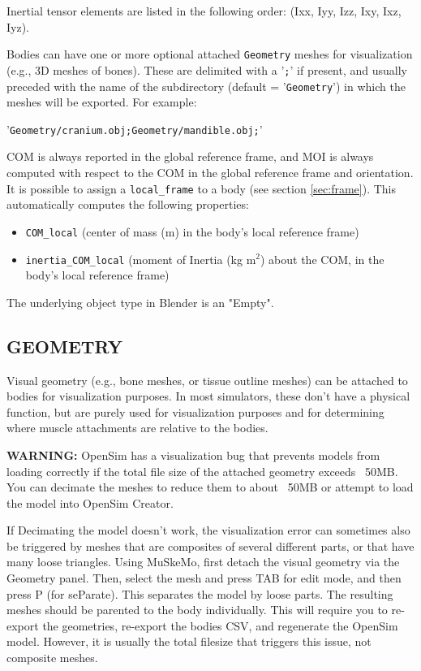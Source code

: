 \documentclass{article}
\begin{document}
Inertial tensor elements are listed in the following order: (Ixx, Iyy, Izz, Ixy, Ixz, Iyz).

Bodies can have one or more optional attached \texttt{Geometry} meshes for visualization (e.g., 3D meshes of bones). These are delimited with a '\texttt{;}' if present, and usually preceded with the name of the subdirectory (default = '\texttt{Geometry}') in which the meshes will be exported. For example: 

'\texttt{Geometry/cranium.obj;Geometry/mandible.obj;}'

COM is always reported in the global reference frame, and MOI is always computed with respect to the COM in the global reference frame and orientation. It is possible to assign a \texttt{local\_frame} to a body (see section \ref{sec:frame}). This automatically computes the following properties:


\begin{itemize}
    \item \texttt{COM\_local} (center of mass (m) in the body's local reference frame)
    \item \texttt{inertia\_COM\_local} (moment of Inertia (kg m\(^2\)) about the COM, in the body's local reference frame)
\end{itemize}

The underlying object type in Blender is an "Empty".

\subsection{GEOMETRY}

Visual geometry (e.g., bone meshes, or tissue outline meshes) can be attached to bodies for visualization purposes. In most simulators, these don’t have a physical function, but are purely used for visualization purposes and for determining where muscle attachments are relative to the bodies. 

\textbf{WARNING:} OpenSim has a visualization bug that prevents models from loading correctly if the total file size of the attached geometry exceeds ~50MB. You can decimate the meshes to reduce them to about ~50MB or attempt to load the model into OpenSim Creator.

If Decimating the model doesn't work, the visualization error can sometimes also be triggered by meshes that are composites of several different parts, or that have many loose triangles. Using MuSkeMo, first detach the visual geometry via the Geometry panel. Then, select the mesh and press TAB for edit mode, and then press P (for seParate). This separates the model by loose parts. The resulting meshes should be  parented to the body individually. 
This will require you to re-export the geometries, re-export the bodies CSV, and regenerate the OpenSim model. However, it is usually the total filesize that triggers this issue, not composite meshes.
\end{document}
